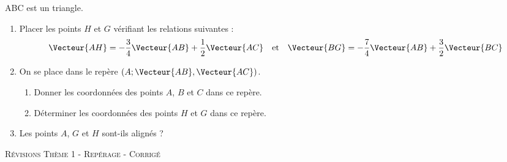 \documentclass[a4paper]{article}
\begin{document}
    \begin{exercice}{}{}
      ABC est un triangle.

      \begin{enumerate}
          \item Placer les points $H$ et $G$ vérifiant les relations suivantes :
          $$ \Vecteur{AH} = -\dfrac{3}{4} \Vecteur{AB} + \dfrac{1}{2} \Vecteur{AC} \quad \text{et} \quad \Vecteur{BG} = -\dfrac{7}{4} \Vecteur{AB} + \dfrac{3}{2} \Vecteur{BC} $$
          \item On se place dans le repère $(A ; \Vecteur{AB}, \Vecteur{AC})$.
          \begin{enumerate}
              \item Donner les coordonnées des points $A$, $B$ et $C$ dans ce repère.
              \item Déterminer les coordonnées des points $H$ et $G$ dans ce repère.
          \end{enumerate}
          \item Les points $A$, $G$ et $H$ sont-ils alignés ?
      \end{enumerate}
      
    \end{exercice}
  \pagebreak
  
  
  
\begin{center}
    {\scshape\LARGE Révisions Thème 1 - Repérage - Corrigé\par}
    \vspace{0.5cm}
  \end{center}

  \setcounter{exercice}{0}
\end{document}
